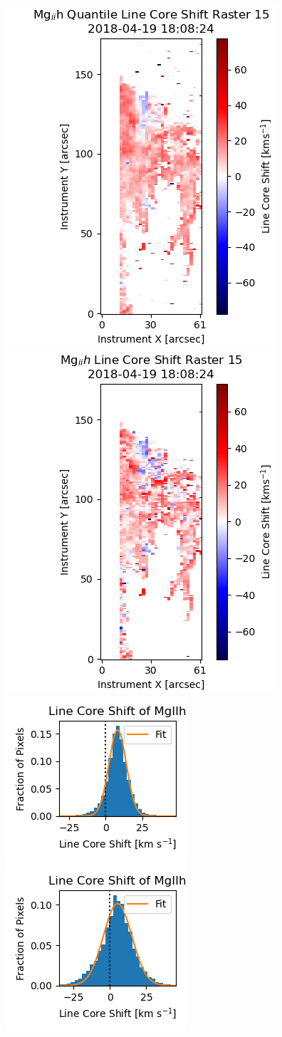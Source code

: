 \begin{figure}
    \centering
    \includegraphics*[width=0.4\linewidth]{./02Modelling1D/figs/20180419/quantdopp.png}
    \includegraphics*[width=0.4\linewidth]{./02Modelling1D/figs/20180419/rolldopp.png}\\
    \includegraphics*[width=0.3\linewidth]{./02Modelling1D/figs/20180419/hvelocities.png}
    \hspace{1cm}
    \includegraphics*[width=0.3\linewidth]{./02Modelling1D/figs/20180419/hvelocitiesfound.png}\\

\end{figure}
